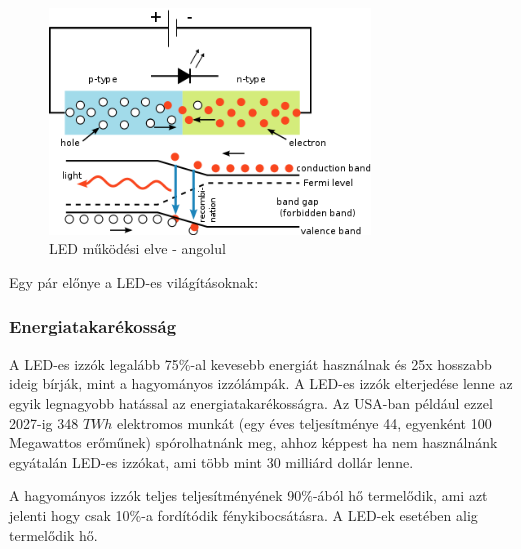 \documentclass[../main.tex]{subfiles}
\begin{document}
    \begin{figure}[h!] %
        \centering
        \includegraphics[height=6cm]{irodalom_res/led_working_principle.png}
        \caption{LED működési elve - angolul} %
    \end{figure}
    Egy pár előnye a LED-es világításoknak:
        \subsubsection{Energiatakarékosság} %
            A LED-es izzók legalább 75\%-al kevesebb energiát használnak és 25x hosszabb ideig bírják, mint a hagyományos izzólámpák. A LED-es izzók elterjedése lenne az egyik legnagyobb hatással az energiatakarékosságra. Az USA-ban például ezzel 2027-ig 348 $TWh$ elektromos munkát (egy éves teljesítménye 44, egyenként 100 Megawattos erőműnek) spórolhatnánk meg, ahhoz képpest ha nem használnánk egyátalán LED-es izzókat, ami több mint 30 milliárd dollár lenne.
            
            A hagyományos izzók teljes teljesítményének 90\%-ából hő termelődik, ami azt jelenti hogy csak 10\%-a fordítódik fénykibocsátásra. A LED-ek esetében alig termelődik hő.
\end{document}
